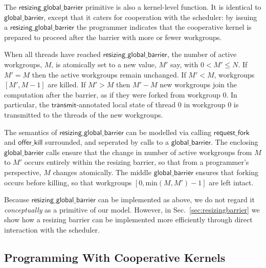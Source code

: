 \documentclass[parskip=half,sigconf,review, anonymous=true, acmcopyrightmode=none]{acmart}
\newcommand{\mysec}{Sec.~}
\newcommand{\transmit}{\mathsf{transmit}}
\newcommand{\offerfork}{\mathsf{request\_fork}}
\newcommand{\offerkill}{\mathsf{offer\_kill}}
\newcommand{\globalbarrier}{\mathsf{global\_barrier}}
\newcommand{\resizingglobalbarrier}{\mathsf{resizing\_global\_barrier}}
\begin{document}
The $\resizingglobalbarrier$ primitive is also a kernel-level
function.  It is identical to $\globalbarrier$, except that it caters
for cooperation with the scheduler: by issuing a
$\resizingglobalbarrier$ the programmer indicates that the cooperative
kernel is prepared to proceed after the barrier with more or fewer workgroups.

When all threads have reached $\resizingglobalbarrier$,
the number of active workgroups, $M$, is atomically set to a new value, $M'$ say, with $0 < M' \leq N$.
If $M' = M$ then the active workgroups remain unchanged.  If $M' < M$, workgroups $[M', M-1]$ are
killed.  If $M' > M$ then $M'-M$ new workgroups join the computation after the barrier,
as if they were forked from workgroup 0.  In particular, the
$\transmit$-annotated local state of thread 0 in workgroup 0 is
transmitted to the threads of the new workgroups.

The semantics of $\resizingglobalbarrier$ can be modelled via calling $\offerfork$ and $\offerkill$
surrounded, and seperated by calls to a $\globalbarrier$.
%
%
The enclosing $\globalbarrier$ calls ensure that the change in number
of active workgroups from $M$ to $M'$ occurs entirely within the
resizing barrier, so that from a programmer's perspective, $M$ changes atomically.  The middle $\globalbarrier$ ensures that forking occurs before killing, so that workgroups $[0, \textrm{min}(M, M') - 1]$ are left intact.

Because $\resizingglobalbarrier$ can be implemented as above, we do not regard it \emph{conceptually} as a primitive of our
model.  However, in
\mysec\ref{sec:resizingbarrier} we show how a resizing barrier can be
implemented more efficiently through direct interaction with the scheduler.

\subsection{Programming With Cooperative Kernels}\label{sec:programmingguidelines}

\end{document}
